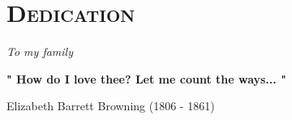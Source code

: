 \chapter*{\huge\scshape  Dedication}
\vspace*{3.5cm}
\begin{center}
\textit{To my family
}
\end{center}
\vfill
\begin{center}
\textbf{"
How do I love thee? Let me count the ways...
"}\vspace{-0.2cm}
\begin{flushright}
Elizabeth Barrett Browning (1806 - 1861)
\end{flushright}
\end{center} 
